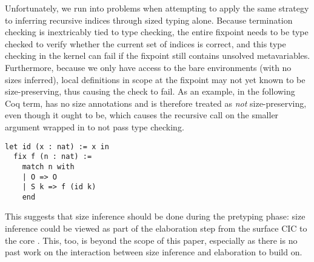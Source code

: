 Unfortunately, we run into problems when attempting to apply the same strategy to inferring recursive indices through sized typing alone.
Because termination checking is inextricably tied to type checking,
the entire fixpoint needs to be type checked to verify whether the current set of indices is correct,
and this type checking in the kernel can fail if the fixpoint still contains unsolved metavariables.
Furthermore, because we only have access to the bare environments (\ie with no sizes inferred),
local definitions in scope at the fixpoint may not yet known to be size-preserving,
thus causing the check to fail.
As an example, in the following Coq term,  has no size annotations and is therefore treated as \emph{not} size-preserving,
even though it ought to be, which causes the recursive call on the smaller argument wrapped in  to not pass type checking.
%
\begin{verbatim}
let id (x : nat) := x in
  fix f (n : nat) :=
    match n with
    | O => O
    | S k => f (id k)
    end
\end{verbatim}
%
This suggests that size inference should be done during the pretyping phase:
size inference could be viewed as part of the elaboration step from the surface CIC to the core \lang.
This, too, is beyond the scope of this paper, especially as there is no past work on the interaction between size inference and elaboration to build on.
